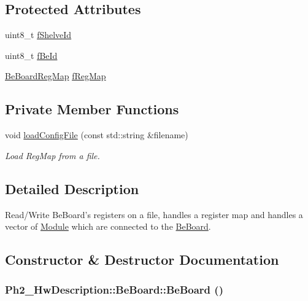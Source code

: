 \subsection*{Protected Attributes}
\begin{CompactItemize}
\item 
uint8\_\-t \hyperlink{class_ph2___hw_description_1_1_be_board_8e45d863c0a596466a78fd3e16ef92d1}{f\-Shelve\-Id}
\item 
uint8\_\-t \hyperlink{class_ph2___hw_description_1_1_be_board_abe1a515a23ff8813d4641293a8b4ba1}{f\-Be\-Id}
\item 
\hyperlink{namespace_ph2___hw_description_2e13fb82c8ed98154c60f9d0f8467d72}{Be\-Board\-Reg\-Map} \hyperlink{class_ph2___hw_description_1_1_be_board_6db4850485715c0f23c97c3d621a781b}{f\-Reg\-Map}
\end{CompactItemize}
\subsection*{Private Member Functions}
\begin{CompactItemize}
\item 
void \hyperlink{class_ph2___hw_description_1_1_be_board_ec21c67ac5b5219cfb13ec13e4905402}{load\-Config\-File} (const std::string \&filename)
\begin{CompactList}\small\item\em Load Reg\-Map from a file. \item\end{CompactList}\end{CompactItemize}


\subsection{Detailed Description}
Read/Write Be\-Board's registers on a file, handles a register map and handles a vector of \hyperlink{class_ph2___hw_description_1_1_module}{Module} which are connected to the \hyperlink{class_ph2___hw_description_1_1_be_board}{Be\-Board}. 



\subsection{Constructor \& Destructor Documentation}
\hypertarget{class_ph2___hw_description_1_1_be_board_3bd1302a3dbf6ff0ba59dab710cfa537}{
\subsubsection[BeBoard]{\setlength{\rightskip}{0pt plus 5cm}Ph2\_\-Hw\-Description::Be\-Board::Be\-Board ()}}
\label{class_ph2___hw_description_1_1_be_board_3bd1302a3dbf6ff0ba59dab710cfa537}


